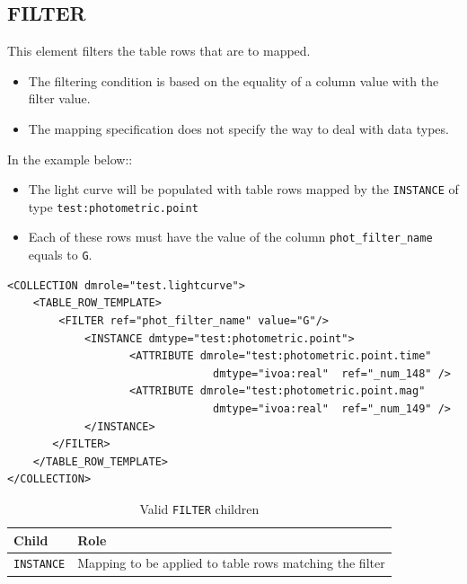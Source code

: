 \documentclass[11pt,a4paper]{ivoa}
\begin{document}
%
%

\subsection{FILTER}
This element filters the table rows that are to mapped. 

\begin{itemize}
   \item The filtering condition is based on the equality of a column value with the filter value.
   \item The mapping specification does not specify the way to deal with data types.
\end{itemize}

In the example below::

\begin{itemize}
   \item The light curve will be populated with table rows mapped by the \texttt{INSTANCE} of type \texttt{test:photometric.point}
   \item Each of these rows must have the value of the column \texttt{phot\_filter\_name} equals to \texttt{G}.
\end{itemize}

\begin{lstlisting}[caption={FILTER examples},style=XML]
<COLLECTION dmrole="test.lightcurve">
    <TABLE_ROW_TEMPLATE>
        <FILTER ref="phot_filter_name" value="G"/>
            <INSTANCE dmtype="test:photometric.point">
                   <ATTRIBUTE dmrole="test:photometric.point.time" 
                                dmtype="ivoa:real"  ref="_num_148" />
                   <ATTRIBUTE dmrole="test:photometric.point.mag" 
                                dmtype="ivoa:real"  ref="_num_149" />
            </INSTANCE>            
       </FILTER>
    </TABLE_ROW_TEMPLATE>
</COLLECTION>
\end{lstlisting}

\begin{table}[hbtp]
\small
\centering
\begin{tabulary}{\linewidth}{|L|J|}
       \hline  
          \textbf{Child} &  
          \textbf{Role}\\
       \hline  \hline
          \texttt{INSTANCE}    & 
          Mapping to be applied to table rows matching the filter \\       
       \hline 
     \end{tabulary}
     \caption{Valid  \texttt{FILTER} children} 
     \label{tbl:filter-children}
\end{table}
\end{document}
